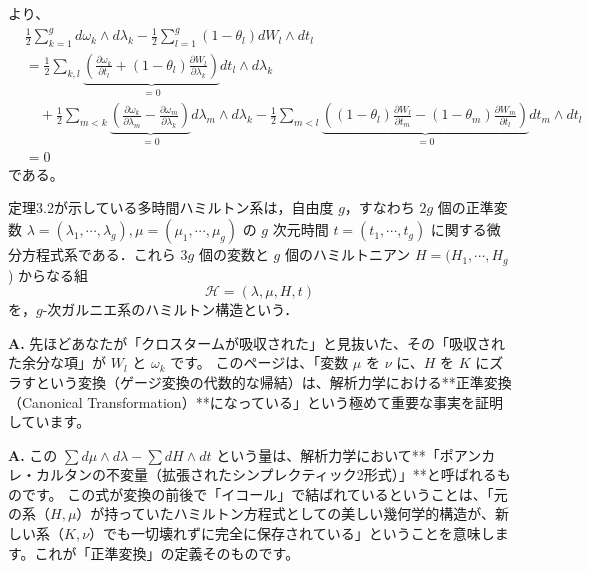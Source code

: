 \begin{story}
より、
\begin{align*}
    & \frac{1}{2}\sum_{k=1}^g d\omega_k \wedge d\lambda_k - \frac{1}{2}\sum_{l=1}^g (1-\theta_l)dW_l \wedge dt_l \\
    &= \frac{1}{2}\sum_{k,l} \underbrace{\left( \frac{\partial \omega_k}{\partial t_l} + (1-\theta_l)\frac{\partial W_l}{\partial \lambda_k} \right)}_{=0} dt_l \wedge d\lambda_k \\
    &\quad + \frac{1}{2}\sum_{m < k} \underbrace{\left( \frac{\partial \omega_k}{\partial \lambda_m} - \frac{\partial \omega_m}{\partial \lambda_k} \right)}_{=0} d\lambda_m \wedge d\lambda_k - \frac{1}{2}\sum_{m < l} \underbrace{\left( (1-\theta_l)\frac{\partial W_l}{\partial t_m} - (1-\theta_m)\frac{\partial W_m}{\partial t_l} \right)}_{=0} dt_m \wedge dt_l \\
    &= 0
\end{align*}
である。

定理3.2が示している多時間ハミルトン系は，自由度 $g$，すなわち $2g$ 個の正準変数 $\lambda = (\lambda_1, \cdots, \lambda_g), \mu = (\mu_1, \cdots, \mu_g)$ の $g$ 次元時間 $t = (t_1, \cdots, t_g)$ に関する微分方程式系である．これら $3g$ 個の変数と $g$ 個のハミルトニアン $H = (H_1, \cdots, H_g$) からなる組
\begin{equation*}
    \mathcal{H} = (\lambda, \mu, H, t)
\end{equation*}
を，$g$-次ガルニエ系のハミルトン構造という．

\end{story}

\begin{Q}[【核心】このページは何を主張しているのか？]
\textbf{A.} 先ほどあなたが「クロスタームが吸収された」と見抜いた、その「吸収された余分な項」が $W_l$ と $\omega_k$ です。
このページは、「変数 $\mu$ を $\nu$ に、$H$ を $K$ にズラすという変換（ゲージ変換の代数的な帰結）は、解析力学における**正準変換（Canonical Transformation）**になっている」という極めて重要な事実を証明しています。
\end{Q}

\begin{Q}
\textbf{A.} この $\sum d\mu \wedge d\lambda - \sum dH \wedge dt$ という量は、解析力学において**「ポアンカレ・カルタンの不変量（拡張されたシンプレクティック2形式）」**と呼ばれるものです。
この式が変換の前後で「イコール」で結ばれているということは、「元の系（$H, \mu$）が持っていたハミルトン方程式としての美しい幾何学的構造が、新しい系（$K, \nu$）でも一切壊れずに完全に保存されている」ということを意味します。これが「正準変換」の定義そのものです。
\end{Q}

